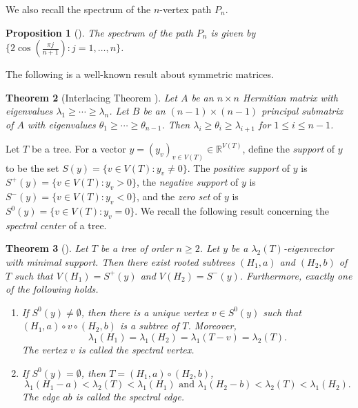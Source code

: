 \documentclass[11pt]{article}
\theoremstyle{plain}
\newtheorem{theorem}{Theorem}[section]
\newtheorem{proposition}[theorem]{Proposition}
\numberwithin{equation}{section}
\begin{document}
We also recall the spectrum of the $n$-vertex path $P_n$. 

\begin{proposition}[\cite{Brouwer_Haemers_book}]\label{prop:path_spectrum}
    The spectrum of the path $P_n$ is given by $\{2\cos(\frac{\pi j}{n+1}): j = 1, \ldots, n\}$.
\end{proposition}

The following is a well-known result about symmetric matrices.

\begin{theorem}[Interlacing Theorem \cite{Horn_Johnson_2013}]
	Let $A$ be an $n\times n$ Hermitian matrix with eigenvalues $\lambda_1 \ge \cdots \ge \lambda_n$. Let $B$ be an $(n-1)\times (n-1)$ principal submatrix of $A$ with eigenvalues $\theta_1\ge \cdots \ge \theta_{n-1}$. Then $\lambda_i \ge \theta_i \ge \lambda_{i+1}$ for $1\le i \le n-1$.
\end{theorem}
 
Let $T$ be a tree. For a vector $y=(y_v)_{v\in V(T)} \in \mathbb{R}^{V(T)}$, define the \emph{support} of $y$ to be the set $S(y)=\{v \in V(T) : y_v\neq 0\}$. The \emph{positive support} of $y$ is $S^+(y) = \{v \in V(T) : y_v> 0\}$, the \emph{negative support} of $y$ is $S^-(y) = \{v \in V(T) : y_v< 0\}$, and the \emph{zero set} of $y$ is $S^0(y) = \{v \in V(T) : y_v= 0\}$. We recall the following result concerning the \emph{spectral center} of a tree.

\begin{theorem}[\cite{KMPZ_trees_diameter_2025}]\label{thm:spectral_center}
    Let $T$ be a tree of order $n\ge 2$. Let $y$ be a $\lambda_2(T)$-eigenvector with minimal support. Then there exist rooted subtrees $(H_1,a)$ and $(H_2,b)$ of $T$ such that $V(H_1) = S^+(y)$ and $V(H_2)=S^-(y)$. Furthermore, exactly one of the following holds. 
    \begin{enumerate}[$(i)$]
        \item If $S^0(y)\neq \emptyset$, then there is a unique vertex $v\in S^0(y)$ such that $(H_1,a)\circ v \circ (H_2,b)$ is a subtree of $T$. Moreover, 
        \[\lambda_1(H_1)=\lambda_1(H_2)=\lambda_1(T-v)=\lambda_2(T).\]  
        The vertex $v$ is called the \emph{spectral vertex}.
        \item If $S^0(y)=\emptyset$, then $T=(H_1,a)\circ (H_2,b)$, 
        \[\lambda_1(H_1-a) < \lambda_2(T) < \lambda_1(H_1) \text{ and } \lambda_1(H_2-b) < \lambda_2(T) < \lambda_1(H_2).\]
        The edge $ab$ is called the \emph{spectral edge}.
    \end{enumerate}
\end{theorem} 
\end{document}
